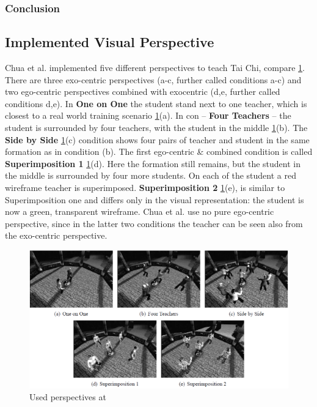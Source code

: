 \subsubsection{Conclusion}


\subsection{Implemented Visual Perspective}
Chua et al. \cite{chua} implemented five different perspectives to teach Tai Chi, compare \ref{fig:taichiperspectives}. There are three exo-centric perspectives (a-c, further called conditions a-c) and two ego-centric perspectives combined with exocentric (d,e, further called conditions d,e). In \textbf{One on One} the student stand next to one teacher, which is closest to a real world training scenario \ref{fig:taichiperspectives}(a). In con \--- \textbf{Four Teachers} \--- the student is surrounded by four teachers, with the student in the middle \ref{fig:taichiperspectives}(b). The \textbf{Side by Side} \ref{fig:taichiperspectives}(c) condition shows four pairs of teacher and student in the same formation as in condition (b). The first ego-centric \& combined condition is called \textbf{Superimposition 1} \ref{fig:taichiperspectives}(d). Here the formation still remains, but the student in the middle is surrounded by four more students. On each of the student a red wireframe teacher is superimposed. \textbf{Superimposition 2} \ref{fig:taichiperspectives}(e), is similar to Superimposition one and differs only in the visual representation: the student is now a green, transparent wireframe. Chua et al. use no pure ego-centric perspective, since in the latter two conditions the teacher can be seen also from the exo-centric perspective.
\begin{figure}
	\centering
	\includegraphics[width=1.0\textwidth]{img/taichi_perspectives.png}
	\caption{Used perspectives at \cite{Chua}}
	\label{fig:taichiperspectives}
\end{figure}\\
